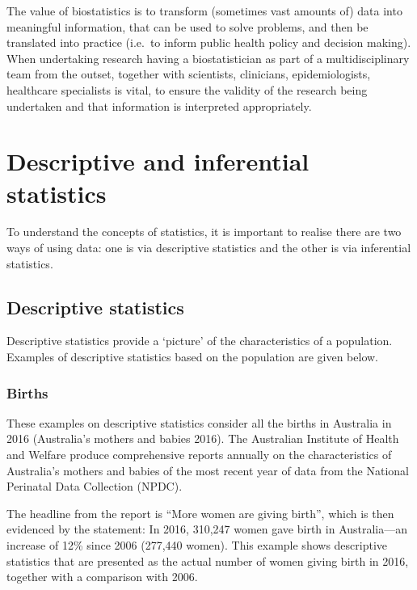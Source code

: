 \documentclass[
]{memoir}
\begin{document}
The value of biostatistics is to transform (sometimes vast amounts of) data into meaningful information, that can be used to solve problems, and then be translated into practice (i.e.~to inform public health policy and decision making). When undertaking research having a biostatistician as part of a multidisciplinary team from the outset, together with scientists, clinicians, epidemiologists, healthcare specialists is vital, to ensure the validity of the research being undertaken and that information is interpreted appropriately.

\hypertarget{descriptive-and-inferential-statistics}{%
\section{Descriptive and inferential statistics}\label{descriptive-and-inferential-statistics}}

To understand the concepts of statistics, it is important to realise there are two ways of using data: one is via descriptive statistics and the other is via inferential statistics.

\hypertarget{descriptive-statistics}{%
\subsection{Descriptive statistics}\label{descriptive-statistics}}

Descriptive statistics provide a `picture' of the characteristics of a population. Examples of descriptive statistics based on the population are given below.

\hypertarget{births}{%
\subsubsection{Births}\label{births}}

These examples on descriptive statistics consider all the births in Australia in 2016 (Australia's mothers and babies 2016). The Australian Institute of Health and Welfare produce comprehensive reports annually on the characteristics of Australia's mothers and babies of the most recent year of data from the National Perinatal Data Collection (NPDC).

The headline from the report is ``More women are giving birth'', which is then evidenced by the statement: In 2016, 310,247 women gave birth in Australia---an increase of 12\% since 2006 (277,440 women). This example shows descriptive statistics that are presented as the actual number of women giving birth in 2016, together with a comparison with 2006.
\end{document}

